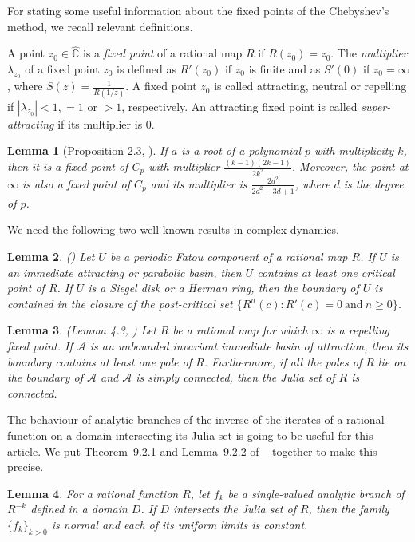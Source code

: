 \documentclass[12pt]{article}
\newtheorem{lem}{Lemma}[section]
\begin{document}
For stating some useful information about the fixed points of the Chebyshev's method, we recall relevant definitions.

A point $z_0 \in \widehat{\mathbb{C}}$ is a \textit{fixed point} of a rational map $R$ if $R(z_0)=z_0$.  
The \textit{multiplier} $\lambda_{z_0}$ of a fixed point $z_0$ is defined as $R'(z_0)$ if $z_0$ is finite and as $S'(0)$ if $z_0=\infty$, where $S(z)=\tfrac{1}{R(1/z)}$. A fixed point $z_0$ is called attracting, neutral or repelling if $|\lambda_{z_0}|<1, =1$ or $>1$, respectively.
An attracting fixed point is called \textit{super-attracting}  if its multiplier is $0$. 
	\begin{lem}[Proposition 2.3, \cite{Nayak-Pal2022}]
		If $a$ is a root of a polynomial $p$ with multiplicity $k$, then it is a fixed point of $C_p$ with multiplier $\frac{(k-1)(2k-1)}{2k^2}$. Moreover, the point at $\infty$ is also a fixed point of $C_p$ and its multiplier is $\frac{2d^2}{2d^2 -3d+1}$, where $d$ is the degree of $p$.
		\label{multiplier-fixedpoints}
	\end{lem}
We need the following two well-known results in complex dynamics.  


\begin{lem} (\cite{Beardon_book}) \label{cpoint}
  Let $U$ be a periodic Fatou component of a rational map $R$.  
 If $U$ is an immediate attracting or parabolic basin, then $U$ contains at least one critical point of $R$. If $U$ is a Siegel disk or a Herman ring, then the boundary of $U$ is contained in the closure of the post-critical set   $\{R^n (c): R'(c) =0 ~\mbox{and}~ n \geq 0\}$.
\end{lem}

\begin{lem}(Lemma 4.3, \cite{Nayak-Pal2022}) \label{Jconnected}
	Let $R$ be a rational map for which $\infty$ is a repelling fixed point. If $\mathcal{A}$ is an unbounded invariant immediate basin of attraction, then its boundary contains at least one pole of $R$. Furthermore, if all the poles of
	$R$  lie on the boundary of $\mathcal{A}$ and $\mathcal{A}$ is simply connected, then the Julia set of $R$ is connected.
\end{lem}
The behaviour of analytic branches of the inverse of the iterates of a rational function on a domain intersecting its Julia set is going to be useful for this article. We put Theorem~9.2.1  and Lemma~9.2.2 of ~\cite{Beardon_book} together to make this precise.
\begin{lem}
For a rational function $R$, let $f_k$ be a single-valued  analytic branch of $R^{-k}$ defined in a domain $D$. If $D$ intersects the Julia set of $R$, then the family $\{f_k\}_{k>0}$ is normal and each of its uniform limits is constant.	
	\label{backward-contraction}
\end{lem}
\end{document}
